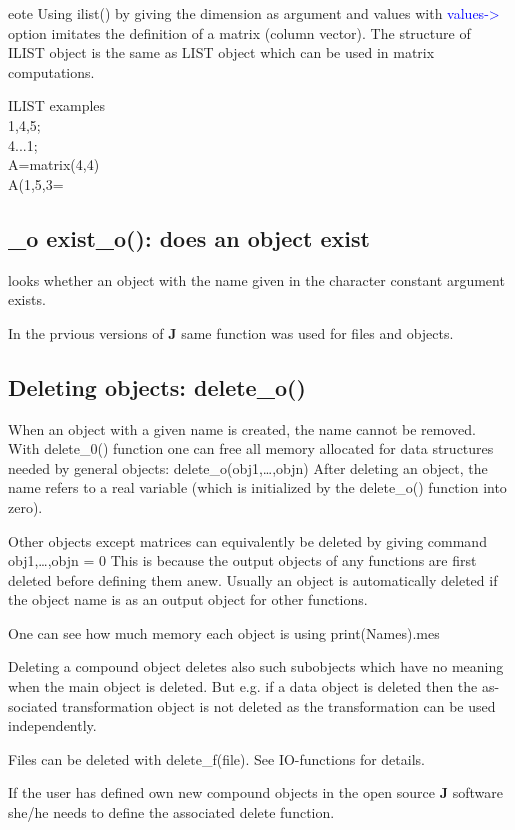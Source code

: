 \begin{note}
eote
Using \textcolor{VioletRed}{ilist}() by giving the dimension as argument and values with \textcolor{blue}{values->} option
imitates the definition of a matrix (column vector). The structure of ILIST object
is the same as LIST object which can be used in matrix computations.
\end{note}
\begin{example}[ilistex]ILIST examples\\
\label{ilistex}
{1,4,5};\\
{4...1};\\
A=\textcolor{VioletRed}{matrix}(4,4)\\
A({1,5},{3}=
\end{example}
\subsection{_o exist\_o(): does an object exist}
\label{exist}
looks whether an object with the name given in
the character constant  argument exists.
\begin{note}
In the prvious versions of \textbf{J} same function was used for files and objects.
\end{note}
\subsection{Deleting objects: delete\_o()}
\label{delete}
When an object with a given name is created, the name cannot be removed. With
delete\_0() function one can free all memory allocated for data structures needed
by general objects:
delete\_o(obj1,…,objn)
After deleting an object, the name refers to a real variable (which is
initialized by the delete\_o() function into zero).
\begin{note}
Other objects except matrices can equivalently be deleted by giving
command
obj1,…,objn = 0
This is because the output objects of any functions are first deleted before
defining them anew. Usually an object is automatically deleted if the object
name is as an output object for other functions.
\end{note}
\begin{note}
One can see how much memory each object is using \textcolor{VioletRed}{print}(Names).mes
\end{note}
\begin{note}
Deleting a compound object deletes also such
subobjects which have no meaning when the main object is deleted. But e.g. if a
data object is deleted then the as-sociated transformation object is not
deleted as the transformation can be used independently.
\end{note}
\begin{note}
Files can be deleted with delete\_f(file). See IO-functions for
details.
\end{note}
\begin{note}
If the user has defined own new compound objects in the open source
\textbf{J} software she/he needs to define the associated delete function.
\end{note}
